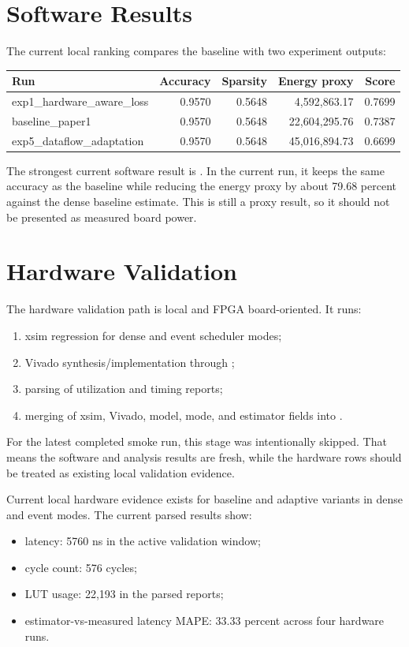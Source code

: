 \documentclass[11pt]{article}
\begin{document}
\section{Software Results}
The current local ranking compares the baseline with two experiment outputs:
\begin{center}
\begin{tabular}{lrrrr}
\toprule
Run & Accuracy & Sparsity & Energy proxy & Score \\
\midrule
exp1\_hardware\_aware\_loss & 0.9570 & 0.5648 & 4,592,863.17 & 0.7699 \\
baseline\_paper1 & 0.9570 & 0.5648 & 22,604,295.76 & 0.7387 \\
exp5\_dataflow\_adaptation & 0.9570 & 0.5648 & 45,016,894.73 & 0.6699 \\
\bottomrule
\end{tabular}
\end{center}

The strongest current software result is . In the
current run, it keeps the same accuracy as the baseline while reducing the energy
proxy by about 79.68 percent against the dense baseline estimate. This is still
a proxy result, so it should not be presented as measured board power.

\section{Hardware Validation}
The hardware validation path is local and FPGA board-oriented. It runs:
\begin{enumerate}[leftmargin=*]
\item xsim regression for dense and event scheduler modes;
\item Vivado synthesis/implementation through ;
\item parsing of utilization and timing reports;
\item merging of xsim, Vivado, model, mode, and estimator fields into
.
\end{enumerate}

For the latest completed smoke run, this stage was intentionally skipped. That
means the software and analysis results are fresh, while the hardware rows should
be treated as existing local validation evidence.

Current local hardware evidence exists for baseline and adaptive variants in
dense and event modes. The current parsed results show:
\begin{itemize}[leftmargin=*]
\item latency: 5760 ns in the active validation window;
\item cycle count: 576 cycles;
\item LUT usage: 22,193 in the parsed reports;
\item estimator-vs-measured latency MAPE: 33.33 percent across four hardware runs.
\end{itemize}
\end{document}
